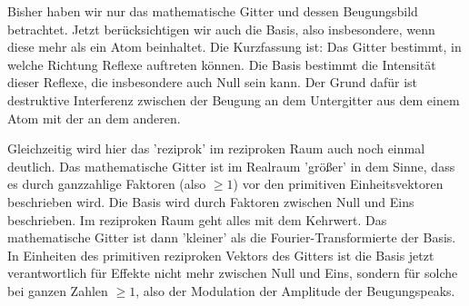Bisher haben wir nur das mathematische Gitter und dessen Beugungsbild betrachtet. Jetzt berücksichtigen wir auch die Basis, also insbesondere, wenn diese mehr als ein Atom beinhaltet. Die Kurzfassung ist: Das Gitter bestimmt, in welche Richtung Reflexe auftreten können. Die Basis bestimmt die Intensität dieser Reflexe, die insbesondere auch Null sein kann. Der Grund dafür ist destruktive Interferenz zwischen der Beugung an dem Untergitter aus dem einem Atom mit der an dem anderen.

Gleichzeitig wird hier das 'reziprok' im reziproken Raum auch noch einmal deutlich. Das mathematische Gitter ist im Realraum 'größer' in dem Sinne, dass es durch ganzzahlige Faktoren (also $\ge 1$) vor den primitiven Einheitsvektoren beschrieben wird. Die Basis wird durch Faktoren zwischen Null und Eins beschrieben. Im reziproken Raum geht alles mit dem Kehrwert. Das mathematische Gitter ist dann 'kleiner' als die Fourier-Transformierte der Basis. In Einheiten des primitiven reziproken Vektors des Gitters ist die Basis jetzt verantwortlich für Effekte nicht mehr zwischen Null und Eins, sondern für solche bei ganzen Zahlen $\ge 1$, also der Modulation der Amplitude der Beugungspeaks.


